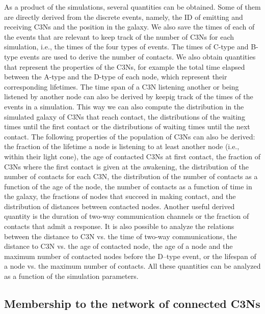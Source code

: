 \documentclass[crop]{CSLB}
\newcommand{\ceti}{C3N}
\newcommand{\cetis}{C3Ns}
\begin{document}
As a product of the simulations, several quantities can be obtained.
%
Some of them are directly derived from the discrete events, namely, the ID of
emitting and receiving \cetis{} and the position in the galaxy.
%
We also save the times of each of the events that are relevant to keep track of
the number of \cetis{} for each simulation, i.e., the times of the four types
of events.
%
The times of C-type and B-type events are used to derive the number of
contacts.
%
We also obtain quantities that represent the properties of the \cetis{}, for
example the total time elapsed between the A-type and the D-type of each node,
which represent their corresponding lifetimes.
%
The time span of a \ceti{} listening another or being listened by another node
can also be derived by keepig track of the times of the events in a simulation.
%
This way we can also compute the distribution in the simulated galaxy of
\cetis{} that reach contact, the distributions of the waiting times until the
first contact or the distributions of waiting times until the next contact.
%
The following properties of the population of \cetis{} can also be derived:
%
the fraction of the lifetime a node is listening to at least another node
(i.e., within their light cone),
%
the age of contacted \cetis{} at first contact,
%
the fraction of \cetis{} where the first contact is given at the awakening,
%
the distribution of the number of contacts for each \ceti{},
%
the distribution of the number of contacts as a function of the age of the
node,
%
the number of contacts as a function of time in the galaxy,
%
the fractions of nodes that succeed in making contact,
%
and the distribution of distances between contacted nodes.
%
Another useful derived quantity is the duration of two-way communication
channels or the fraction of contacts that admit a response.
% 
It is also possible to analyze the relations between the distance to \ceti{}
vs. the time of two-way communications, the distance to \ceti{} vs. the age of
contacted node, the age of a node and the maximum number of contacted nodes
before the D--type event, or the lifespan of a node vs. the maximum number of
contacts.
%
All these quantities can be analyzed as a function of the simulation
parameters.



\subsection{Membership to the network of connected \cetis{}}\label{SS_members}
\end{document}
